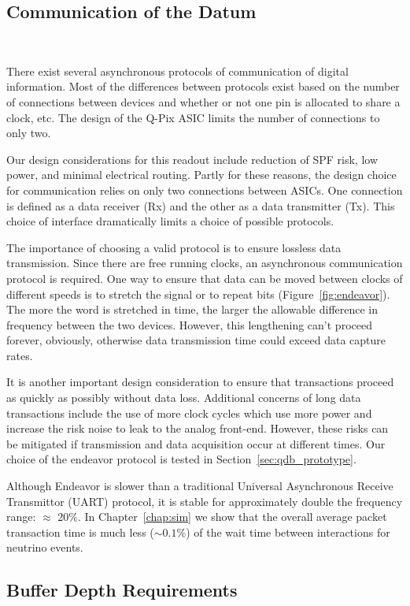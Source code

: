 \subsection{Communication of the Datum}~\label{sec:comms}

There exist several asynchronous protocols of communication of digital information.
Most of the differences between protocols exist based on the number of connections between devices and whether or not one pin is allocated to share a clock, etc.
The design of the Q-Pix ASIC limits the number of connections to only two.

Our design considerations for this readout include reduction of SPF risk, low power, and minimal electrical routing.
Partly for these reasons, the design choice for communication relies on only two connections between ASICs.
One connection is defined as a data receiver (Rx) and the other as a data transmitter (Tx).
This choice of interface dramatically limits a choice of possible protocols.

The importance of choosing a valid protocol is to ensure lossless data transmission.
Since there are free running clocks, an asynchronous communication protocol is required.
One way to ensure that data can be moved between clocks of different speeds is to stretch the signal or to repeat bits (Figure~\ref{fig:endeavor}).
The more the word is stretched in time, the larger the allowable difference in frequency between the two devices.
However, this lengthening can't proceed forever, obviously, otherwise data transmission time could exceed data capture rates.

It is another important design consideration to ensure that transactions proceed as quickly as possibly without data loss.
Additional concerns of long data transactions include the use of more clock cycles which use more power and increase the risk noise to leak to the analog front-end.
However, these risks can be mitigated if transmission and data acquisition occur at different times.
Our choice of the endeavor protocol is tested in Section~\ref{sec:qdb_prototype}.

Although Endeavor is slower than a traditional Universal Asynchronous Receive Transmittor (UART) protocol, it is stable for approximately double the frequency range: $\approx$ 20\%.
In Chapter~\ref{chap:sim} we show that the overall average packet transaction time is much less ($\sim 0.1\%$) of the wait time between interactions for neutrino events.

\subsection{Buffer Depth Requirements}~\label{sec:buffer_requirements}

